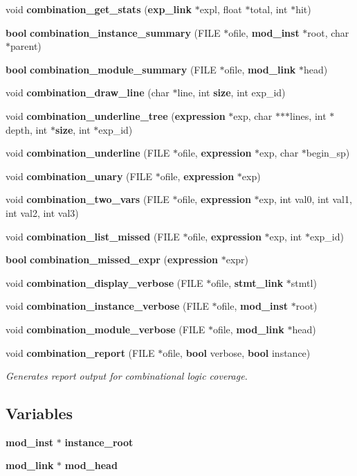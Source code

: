 \begin{CompactItemize}
\item 
void {\bf combination\_\-get\_\-stats} ({\bf exp\_\-link} $\ast$expl, float $\ast$total, int $\ast$hit)
\item 
{\bf bool} {\bf combination\_\-instance\_\-summary} (FILE $\ast$ofile, {\bf mod\_\-inst} $\ast$root, char $\ast$parent)
\item 
{\bf bool} {\bf combination\_\-module\_\-summary} (FILE $\ast$ofile, {\bf mod\_\-link} $\ast$head)
\item 
void {\bf combination\_\-draw\_\-line} (char $\ast$line, int {\bf size}, int exp\_\-id)
\item 
void {\bf combination\_\-underline\_\-tree} ({\bf expression} $\ast$exp, char $\ast$$\ast$$\ast$lines, int $\ast$depth, int $\ast${\bf size}, int $\ast$exp\_\-id)
\item 
void {\bf combination\_\-underline} (FILE $\ast$ofile, {\bf expression} $\ast$exp, char $\ast$begin\_\-sp)
\item 
void {\bf combination\_\-unary} (FILE $\ast$ofile, {\bf expression} $\ast$exp)
\item 
void {\bf combination\_\-two\_\-vars} (FILE $\ast$ofile, {\bf expression} $\ast$exp, int val0, int val1, int val2, int val3)
\item 
void {\bf combination\_\-list\_\-missed} (FILE $\ast$ofile, {\bf expression} $\ast$exp, int $\ast$exp\_\-id)
\item 
{\bf bool} {\bf combination\_\-missed\_\-expr} ({\bf expression} $\ast$expr)
\item 
void {\bf combination\_\-display\_\-verbose} (FILE $\ast$ofile, {\bf stmt\_\-link} $\ast$stmtl)
\item 
void {\bf combination\_\-instance\_\-verbose} (FILE $\ast$ofile, {\bf mod\_\-inst} $\ast$root)
\item 
void {\bf combination\_\-module\_\-verbose} (FILE $\ast$ofile, {\bf mod\_\-link} $\ast$head)
\item 
void {\bf combination\_\-report} (FILE $\ast$ofile, {\bf bool} verbose, {\bf bool} instance)
\begin{CompactList}\small\item\em Generates report output for combinational logic coverage.\item\end{CompactList}\end{CompactItemize}
\subsection*{Variables}
\begin{CompactItemize}
\item 
{\bf mod\_\-inst} $\ast$ {\bf instance\_\-root}
\item 
{\bf mod\_\-link} $\ast$ {\bf mod\_\-head}
\end{CompactItemize}


